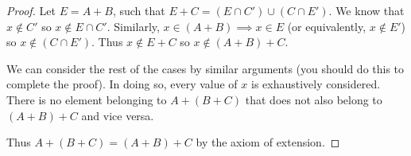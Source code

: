 \documentclass[12pt]{article}
\begin{document}
\begin{proof}
    Let $E = A + B$, such that $E + C = (E \cap C') \cup (C \cap E')$. We know that $x \notin C'$ so
    $x \notin E \cap C'$. Similarly, $x \in (A + B) \implies x \in E$ (or equivalently, $x \notin E'$)
    so $x \notin (C \cap E')$. Thus $x \notin E + C$ so $x \notin (A + B) + C$.

    We can consider the rest of the cases by similar arguments (you should do this to complete the proof). In doing so, every value of
    $x$ is exhaustively considered. There is no element belonging to $A + (B + C)$ that does not also
    belong to $(A + B) + C$ and vice versa.

    Thus $A + (B + C) = (A + B) + C$ by the axiom of extension.
\end{proof}
\end{document}
